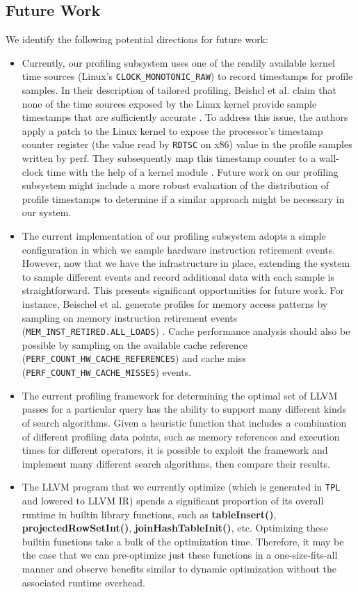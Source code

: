 \documentclass{vldb}
\newcommand{\tpl}{\texttt{TPL}\xspace}
\newcommand{\dbCode}[1]{{\sffamily\small \textbf{#1}}\xspace}
\begin{document}
\subsection{Future Work}

We identify the following potential directions for future work:
\begin{itemize}
    \item Currently, our profiling subsystem uses one of the readily available kernel time sources (Linux's \lstinline{CLOCK_MONOTONIC_RAW}) to record timestamps for profile samples. In their description of tailored profiling, Beishcl et al. claim that none of the time sources exposed by the Linux kernel provide sample timestamps that are sufficiently accurate \cite{beischl21}. To address this issue, the authors apply a patch to the Linux kernel to expose the processor's timestamp counter register (the value read by \lstinline{RDTSC} on x86) value in the profile samples written by perf. They subsequently map this timestamp counter to a wall-clock time with the help of a kernel module \cite{beischl21}. Future work on our profiling subsystem might include a more robust evaluation of the distribution of profile timestamps to determine if a similar approach might be necessary in our system. 
    \item The current implementation of our profiling subsystem adopts a simple configuration in which we sample hardware instruction retirement events. However, now that we have the infrastructure in place, extending the system to sample different events and record additional data with each sample is straightforward. This presents significant opportunities for future work. For instance, Beischel et al. generate profiles for memory access patterns by sampling on memory instruction retirement events (\lstinline{MEM_INST_RETIRED.ALL_LOADS}) \cite{beischl21}. Cache performance analysis should also be possible by sampling on the available cache reference (\lstinline{PERF_COUNT_HW_CACHE_REFERENCES}) and cache miss (\lstinline{PERF_COUNT_HW_CACHE_MISSES}) events.
    \item The current profiling framework for determining the optimal set of LLVM passes for a particular query has the ability to support many different kinds of search algorithms. Given a heuristic function that includes a combination of different profiling data points, such as memory references and execution times for different operators, it is possible to exploit the framework and implement many different search algorithms, then compare their results.
    \item The LLVM program that we currently optimize (which is generated in \tpl and lowered to LLVM IR) spends a significant proportion of its overall runtime in builtin library functions, such as \dbCode{tableInsert()}, \dbCode{projectedRowSetInt()}, \dbCode{joinHashTableInit()}, etc. Optimizing these builtin functions take a bulk of the optimization time. Therefore, it may be the case that we can pre-optimize just these functions in a one-size-fits-all manner and observe benefits similar to dynamic optimization without the associated runtime overhead.
\end{itemize}
\end{document}
